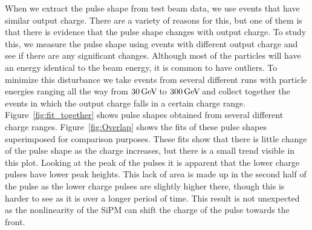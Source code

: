 When we extract the pulse shape from test beam data, we use events that have similar output charge. There are a variety of reasons for this, but one of them is that there is evidence that the pulse shape changes with output charge. To study this, we measure the pulse shape using events with different output charge and see if there are any significant changes. Although most of the particles will have an energy identical to the beam energy, it is common to have outliers. To minimize this disturbance we take events from several different runs with particle energies ranging all the way from $30 {\,\text{Ge\hspace{-.08em}V\hspace{-0.16em}}}$ to $300 {\,\text{Ge\hspace{-.08em}V\hspace{-0.16em}}}$ and collect together the events in which the output charge falls in a certain charge range. Figure~\ref{fig:fit_together} shows pulse shapes obtained from several different charge ranges. Figure~\ref{fig:Overlap} shows the fits of these pulse shapes superimposed for comparison purposes. These fits show that there is little change of the pulse shape as the charge increases, but there is a small trend visible in this plot. Looking at the peak of the pulses it is apparent that the lower charge pulses have lower peak heights. This lack of area is made up in the second half of the pulse as the lower charge pulses are slightly higher there, though this is harder to see as it is over a longer period of time. This result is not unexpected as the nonlinearity of the SiPM can shift the charge of the pulse towards the front. 



